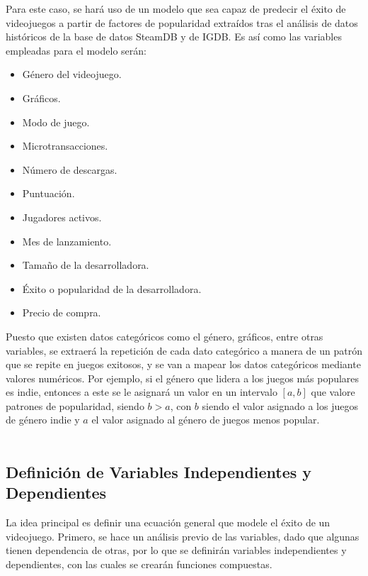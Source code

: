 \documentclass[titlepage,a4paper]{article}
\begin{document}
Para este caso, se hará uso de un modelo que sea capaz de predecir el éxito de videojuegos a partir de factores de popularidad extraídos tras el análisis de datos históricos de la base de datos SteamDB y de IGDB. Es así como las variables empleadas para el modelo serán:

\begin{itemize}
    \item Género del videojuego.
    \item Gráficos.
    \item Modo de juego.
    \item Microtransacciones.
    \item Número de descargas.
    \item Puntuación.
    \item Jugadores activos.
    \item Mes de lanzamiento.
    \item Tamaño de la desarrolladora.
    \item Éxito o popularidad de la desarrolladora.
    \item Precio de compra. \\
\end{itemize}

Puesto que existen datos categóricos como el género, gráficos, entre otras variables, se extraerá la repetición de cada dato categórico a manera de un patrón que se repite en juegos exitosos, y se van a mapear los datos categóricos mediante valores numéricos. Por ejemplo, si el género que lidera a los juegos más populares es indie, entonces a este se le asignará un valor en un intervalo $[a, b]$ que valore patrones de popularidad, siendo $b>a$, con $b$ siendo el valor asignado a los juegos de género indie y $a$ el valor asignado al género de juegos menos popular. \\\\

\subsection{Definición de Variables Independientes y Dependientes}
La idea principal es definir una ecuación general que modele el éxito de un videojuego. Primero, se hace un análisis previo de las variables, dado que algunas tienen dependencia de otras, por lo que se definirán variables independientes y dependientes, con las cuales se crearán funciones compuestas. \\
\end{document}
